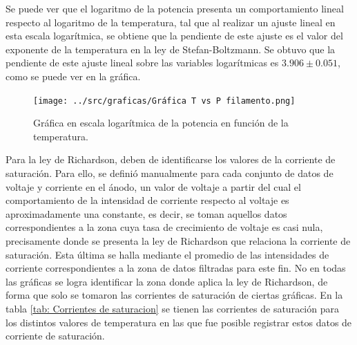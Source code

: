 \documentclass[%
 reprint,
 amsmath,amssymb,
 aps,
]{revtex4-2}
\begin{document}
\vspace{0.2 cm}
Se puede ver que el logaritmo de la potencia presenta un comportamiento lineal respecto al logaritmo de la temperatura, tal que al realizar un ajuste lineal en esta escala logarítmica, se obtiene que la pendiente de este ajuste es el valor del exponente de la temperatura en la ley de Stefan-Boltzmann. Se obtuvo que la pendiente de este ajuste lineal sobre las variables logarítmicas es $3.906 \pm 0.051$, como se puede ver en la gráfica.

\begin{figure}[H]
    \centering
    \texttt{[image: ../src/graficas/Gráfica T vs P filamento.png]}
    \caption{Gráfica en escala logarítmica de la potencia en función de la temperatura.}
    \label{fig: Gráfica T vs P filamento}
\end{figure}

\vspace{0.2 cm}
Para la ley de Richardson, deben de identificarse los valores de la corriente de saturación. Para ello, se definió manualmente para cada conjunto de datos de voltaje y corriente en el ánodo, un valor de voltaje a partir del cual el comportamiento de la intensidad de corriente respecto al voltaje es aproximadamente una constante, es decir, se toman aquellos datos correspondientes a la zona cuya tasa de crecimiento de voltaje es casi nula, precisamente donde se presenta la ley de Richardson que relaciona la corriente de saturación. Esta última se halla mediante el promedio de las intensidades de corriente correspondientes a la zona de datos filtradas para este fin. No en todas las gráficas se logra identificar la zona donde aplica la ley de Richardson, de forma que solo se tomaron las corrientes de saturación de ciertas gráficas. En la tabla \ref{tab: Corrientes de saturacion} se tienen las corrientes de saturación para los distintos valores de temperatura en las que fue posible registrar estos datos de corriente de saturación. 
\end{document}
